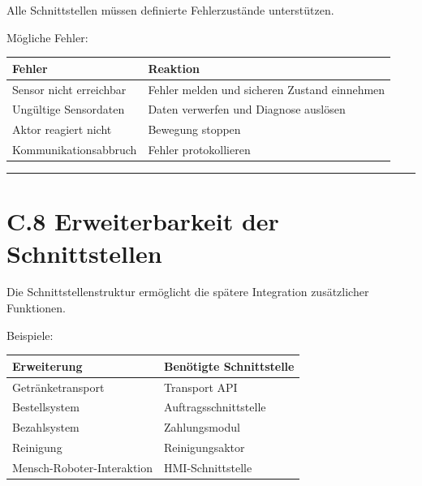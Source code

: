 \documentclass[
]{article}
\begin{document}
Alle Schnittstellen müssen definierte Fehlerzustände unterstützen.

Mögliche Fehler:

\begin{longtable}[]{@{}
  >{\raggedright\arraybackslash}p{}
  >{\raggedright\arraybackslash}p{}@{}}
\toprule\noalign{}
\begin{minipage}[b]{\linewidth}\raggedright
Fehler
\end{minipage} & \begin{minipage}[b]{\linewidth}\raggedright
Reaktion
\end{minipage} \\
\midrule\noalign{}
\endhead
\bottomrule\noalign{}
\endlastfoot
Sensor nicht erreichbar & Fehler melden und sicheren Zustand
einnehmen \\
Ungültige Sensordaten & Daten verwerfen und Diagnose auslösen \\
Aktor reagiert nicht & Bewegung stoppen \\
Kommunikationsabbruch & Fehler protokollieren \\
\end{longtable}

\begin{center}\rule{0.5\linewidth}{0.5pt}\end{center}

\section{C.8 Erweiterbarkeit der
Schnittstellen}\label{c.8-erweiterbarkeit-der-schnittstellen}

Die Schnittstellenstruktur ermöglicht die spätere Integration
zusätzlicher Funktionen.

Beispiele:

\begin{longtable}[]{@{}ll@{}}
\toprule\noalign{}
Erweiterung & Benötigte Schnittstelle \\
\midrule\noalign{}
\endhead
\bottomrule\noalign{}
\endlastfoot
Getränketransport & Transport API \\
Bestellsystem & Auftragsschnittstelle \\
Bezahlsystem & Zahlungsmodul \\
Reinigung & Reinigungsaktor \\
Mensch-Roboter-Interaktion & HMI-Schnittstelle \\
\end{longtable}
\end{document}
